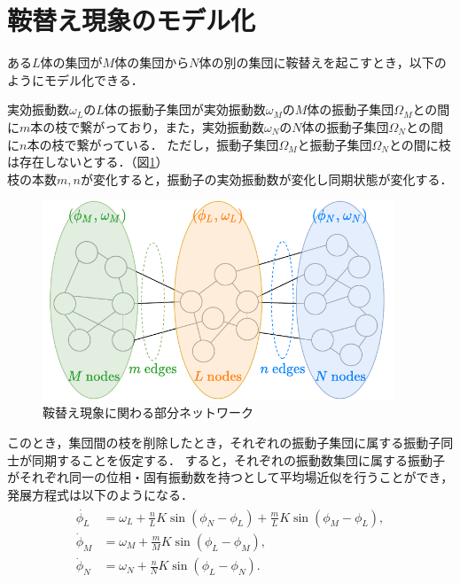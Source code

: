 \documentclass[../main]{subfiles}
\begin{document}
\section{鞍替え現象のモデル化}
ある$L$体の集団が$M$体の集団から$N$体の別の集団に鞍替えを起こすとき，以下のようにモデル化できる．
\begin{screen}
実効振動数$\omega_L$の$L$体の振動子集団が実効振動数$\omega_M$の$M$体の振動子集団$\Omega_M$との間に$m$本の枝で繋がっており，また，実効振動数$\omega_N$の$N$体の振動子集団$\Omega_N$との間に$n$本の枝で繋がっている．
ただし，振動子集団$\Omega_M$と振動子集団$\Omega_N$との間に枝は存在しないとする．（図\ref{fig:switch}）\\
枝の本数$m,n$が変化すると，振動子の実効振動数が変化し同期状態が変化する．
\end{screen}
\begin{figure}[tbp]
\centering
\includegraphics[width=105mm]{./images/three_obj_before.pdf}
\centering
\caption{鞍替え現象に関わる部分ネットワーク}
\label{fig:switch}
\end{figure}
このとき，集団間の枝を削除したとき，それぞれの振動子集団に属する振動子同士が同期することを仮定する．
すると，それぞれの振動数集団に属する振動子がそれぞれ同一の位相・固有振動数を持つとして平均場近似を行うことができ，発展方程式は以下のようになる．
\begin{align}
    \label{eq:3body-default}
    \begin{split}
        \dot{\phi_L}&=\omega_L+\frac{n}{L}K\sin\left( \phi_N-\phi_L \right)+\frac{m}{L}K\sin\left( \phi_M-\phi_L \right),\\
        \dot{\phi}_M&=\omega_M+\frac{m}{M}K\sin\left( \phi_L-\phi_M \right), \\
        \dot{\phi}_N&=\omega_N+\frac{n}{N}K\sin\left( \phi_L-\phi_N \right).    
    \end{split}
\end{align}
\end{document}
